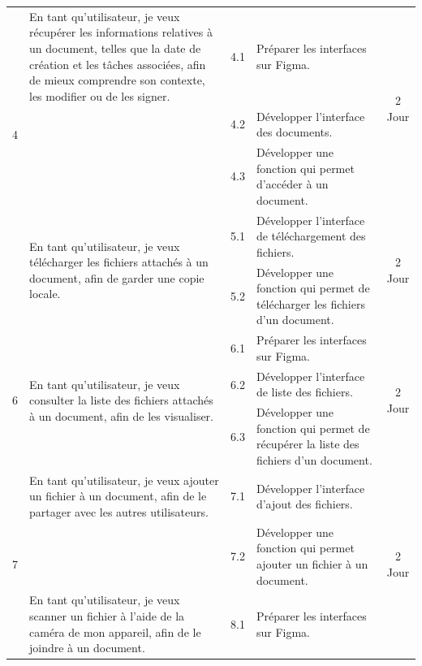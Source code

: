 \begin{adjustwidth}{-1cm}{}
\begin{longtable}{|c|p{6cm}|c|p{6cm}|c|}
      \cline{1-5}
      \multirow{4}{*}{4} & En tant qu'utilisateur, je veux récupérer les informations relatives à un document, telles que la date de création et les tâches associées, afin de mieux comprendre son contexte, les modifier ou de les signer. & 4.1 & Préparer les interfaces sur Figma. & \multirow{3}{*}{2 Jour} \\
      \cline{3-4}
      & & 4.2 & Développer l'interface des documents. & \\
      \cline{3-4}
      & & 4.3 & Développer une fonction qui permet d'accéder à un document. & \\
      \cline{1-5}
      \multirow{2}{*}{5} & \multirow{2}{6cm}{En tant qu'utilisateur, je veux télécharger les fichiers attachés à un document, afin de garder une copie locale.} & 5.1 & Développer l'interface de téléchargement des fichiers. & \multirow{2}{*}{2 Jour} \\
      \cline{3-4}
      & & 5.2 & Développer une fonction qui permet de télécharger les fichiers d'un document. & \\
      \cline{1-5}
      \multirow{3}{*}{6} & \multirow{3}{6cm}{En tant qu'utilisateur, je veux consulter la liste des fichiers attachés à un document, afin de les visualiser.} & 6.1 & Préparer les interfaces sur Figma. & \multirow{3}{*}{2 Jour} \\
      \cline{3-4}
      & & 6.2 & Développer l'interface de liste des fichiers. & \\
      \cline{3-4}
      & & 6.3 & Développer une fonction qui permet de récupérer la liste des fichiers d'un document. & \\
      \cline{1-5}
      \multirow{3}{*}{7} & En tant qu'utilisateur, je veux ajouter un fichier à un document, afin de le partager avec les autres utilisateurs. & 7.1 & Développer l'interface d'ajout des fichiers. & \multirow{3}{*}{2 Jour} \\
      \cline{3-4}
      & & 7.2 & Développer une fonction qui permet ajouter un fichier à un document. & \\
      \cline{1-5}
      \multirow{3}{*}{8} & \multirow{3}{6cm}{En tant qu'utilisateur, je veux scanner un fichier à l'aide de la caméra de mon appareil, afin de le joindre à un document.} & 8.1 & Préparer les interfaces sur Figma. & \multirow{3}{*}{2 Jour} \\
      \cline{3-4}

\end{longtable}
\end{adjustwidth}
